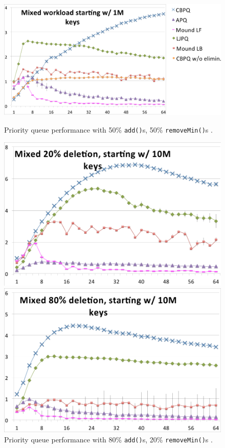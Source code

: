 \begin{figure}[htb]
	\centering
	\begin{minipage}[b]{.7\textwidth}
		\centering
		\includegraphics[width=\linewidth]{graphics/cbpq_50add_50.png}
		\caption{Priority queue performance with 50\% \texttt{add()}s, 50\% \texttt{removeMin()}s \cite{braginsky_cbpq:_2016}.}
		\label{fig:cbpq_50}
	\end{minipage}
	\hfill%
	\begin{minipage}[b]{.495\textwidth}
		\centering
		\includegraphics[width=\linewidth]{graphics/cbpq_80add_20.png}
		\caption{Priority queue performance with 80\% \texttt{add()}s, 20\% \texttt{removeMin()}s \cite{braginsky_cbpq:_2016}.}
		\label{fig:cbpq_80}
	\end{minipage}
	\begin{minipage}[b]{.495\textwidth}
		\centering
		\includegraphics[width=\linewidth]{graphics/cbpq_20add_80.png}

\end{minipage}
\end{figure}
